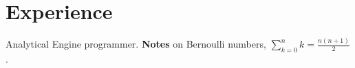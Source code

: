 \documentclass[11pt]{article}
\begin{document}
\section*{Experience}
Analytical Engine programmer. \textbf{Notes} on Bernoulli numbers, $\sum_{k=0}^{n} k = \frac{n(n+1)}{2}$.
\end{document}
